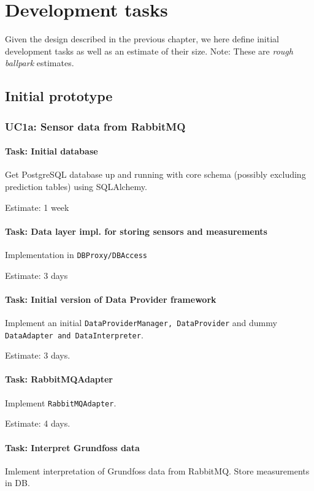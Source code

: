 \chapter{Development tasks}
Given the design described in the previous chapter, we here define initial development tasks as well as an estimate of their size. 
Note: These are \emph{rough ballpark} estimates.




\section{Initial prototype}

\subsection*{UC1a: Sensor data from RabbitMQ}
\subsubsection{Task: Initial database}
Get PostgreSQL database up and running with core schema (possibly excluding prediction tables) using SQLAlchemy.

Estimate: 1 week


\subsubsection{Task: Data layer impl. for storing sensors and measurements}
Implementation in \texttt{DBProxy/DBAccess}

Estimate: 3 days


\subsubsection{Task: Initial version of Data Provider framework}
Implement an initial \texttt{DataProviderManager, DataProvider} and dummy \texttt{DataAdapter and DataInterpreter}.

Estimate: 3 days.

\subsubsection{Task: RabbitMQAdapter}
Implement \texttt{RabbitMQAdapter}.

Estimate: 4 days.

\subsubsection{Task: Interpret Grundfoss data}
Imlement interpretation of Grundfoss data from RabbitMQ. Store measurements in DB.

